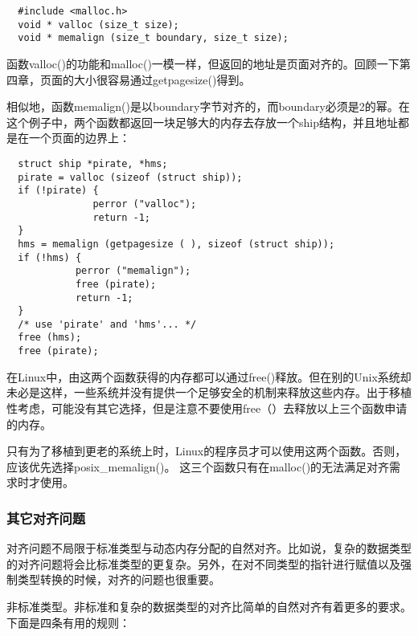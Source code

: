 \begin{lstlisting}
  #include <malloc.h>
  void * valloc (size_t size);
  void * memalign (size_t boundary, size_t size);
\end{lstlisting}

函数valloc()的功能和malloc()一模一样，但返回的地址是页面对齐的。回顾一下第四章，页面的大小很容易通过getpagesize()得到。

相似地，函数memalign()是以boundary字节对齐的，而boundary必须是2的幂。在这个例子中，两个函数都返回一块足够大的内存去存放一个ship结构，并且地址都是在一个页面的边界上： 

\begin{lstlisting}
  struct ship *pirate, *hms;
  pirate = valloc (sizeof (struct ship));
  if (!pirate) {
               perror ("valloc");
               return -1;
  }
  hms = memalign (getpagesize ( ), sizeof (struct ship));
  if (!hms) {
            perror ("memalign");
            free (pirate);
            return -1;
  }
  /* use 'pirate' and 'hms'... */
  free (hms);
  free (pirate);
\end{lstlisting}

在Linux中，由这两个函数获得的内存都可以通过free()释放。但在别的Unix系统却未必是这样，一些系统并没有提供一个足够安全的机制来释放这些内存。出于移植性考虑，可能没有其它选择，但是注意不要使用free（）去释放以上三个函数申请的内存。

只有为了移植到更老的系统上时，Linux的程序员才可以使用这两个函数。否则，应该优先选择posix\_memalign()。 这三个函数只有在malloc()的无法满足对齐需求时才使用。 

\subsubsection{其它对齐问题}

对齐问题不局限于标准类型与动态内存分配的自然对齐。比如说，复杂的数据类型的对齐问题将会比标准类型的更复杂。另外，在对不同类型的指针进行赋值以及强制类型转换的时候，对齐的问题也很重要。 

  非标准类型。非标准和复杂的数据类型的对齐比简单的自然对齐有着更多的要求。下面是四条有用的规则： 

